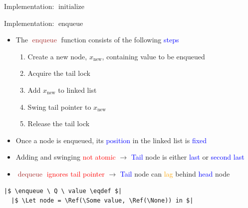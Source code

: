 \documentclass[9pt,xcolor={dvipsnames}]{beamer}
\newcommand{\initialise}{\operatorname{initialize}}
\newcommand{\enqueue}{\operatorname{enqueue}}
\newcommand{\dequeue}{\operatorname{dequeue}}
\newcommand{\locinM}[1]{\loc_{#1\_\mathrm{in}}}
\newcommand{\locoutM}[1]{\loc_{#1\_\mathrm{out}}}
\newcommand{\locN}[1]{\loc_{\mathrm{#1}}}
\newcommand{\lochead}{\locN{head}}
\newcommand{\loctail}{\locN{tail}}
\newcommand{\node}{x}
\newcommand{\nodeN}[1]{\node_{\mathrm{#1}}}
\newcommand{\nodenew}{\nodeN{new}}
\begin{document}
\begin{frame}[fragile]{Implementation: $\initialise$}
\begin{center}
{
  }
  \end{center}
\end{frame}

\begin{frame}[fragile]{Implementation: $\enqueue$}
  \begin{itemize}
    \item The \textcolor{Brown}{$\enqueue$} function consists of the following \textcolor{blue}{steps}
    \begin{enumerate}
      \item Create a new node, $\nodenew$, containing value to be enqueued
      \item Acquire the tail lock
      \item Add $\nodenew$ to linked list
      \item Swing tail pointer to $\nodenew$
      \item Release the tail lock
    \end{enumerate}
    \item<5-> Once a node is enqueued, its \textcolor{blue}{position} in the linked list is \textcolor{blue}{fixed}
    \item<6-> Adding and swinging \textcolor{red}{not atomic} $\rightarrow$ \textcolor{blue}{Tail} node is either \textcolor{blue}{last} or \textcolor{blue}{second last}
    \item<7-> \textcolor{Brown}{$\dequeue$} \textcolor{red}{ignores tail pointer} $\rightarrow$ \textcolor{blue}{Tail} node can \textcolor{orange}{lag} behind \textcolor{blue}{head} node
  \end{itemize}
  \vspace{-8pt}
  \begin{verbatim}
|$ \enqueue \ Q \ value \eqdef $|
  |$ \Let node = \Ref(\Some value, \Ref(\None)) in $|

\end{verbatim}
\end{frame}
\end{document}
